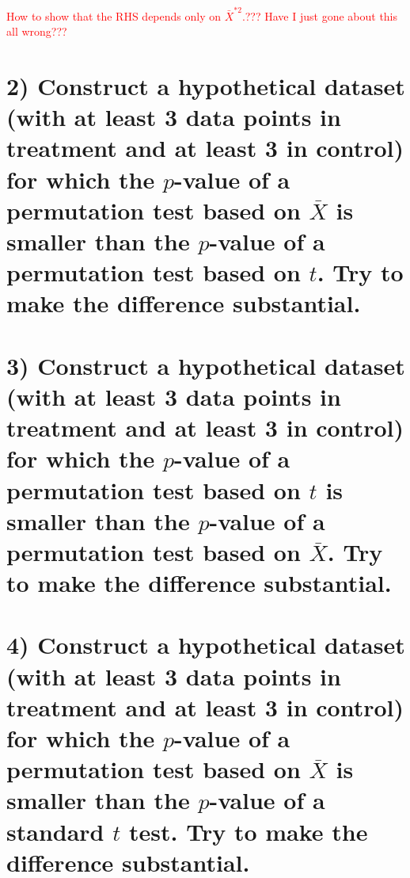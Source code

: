 \documentclass[11pt]{article}
\begin{document}
\noindent \textcolor{red}{How to show that the RHS depends only on $\bar{X}^{*2}$.??? Have I just gone about this all wrong???} 

\section*{2) Construct a hypothetical dataset (with at least 3 data points in treatment and at least 3 in control) for which the $p$-value of a permutation test based on $\bar{X}$ is smaller than the $p$-value of a permutation test based on $t$. Try to make the difference substantial.}


\section*{3) Construct a hypothetical dataset (with at least 3 data points in treatment and at least 3 in control) for which the $p$-value of a permutation test based on $t$ is smaller than the $p$-value of a permutation test based on $\bar{X}$. Try to make the difference substantial.}

\section*{4) Construct a hypothetical dataset (with at least 3 data points in treatment and at least 3 in control) for which the $p$-value of a permutation test based on $\bar{X}$ is smaller than the $p$-value of a standard $t$ test. Try to make the difference substantial.}
\end{document}
